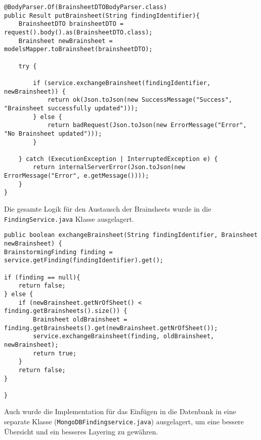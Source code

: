 \begin{lstlisting}[caption={PutBrainsheet nach Refactoring}, label=putBrainsheetNachRef]
@BodyParser.Of(BrainsheetDTOBodyParser.class)
public Result putBrainsheet(String findingIdentifier){
    BrainsheetDTO brainsheetDTO = request().body().as(BrainsheetDTO.class);
    Brainsheet newBrainsheet = modelsMapper.toBrainsheet(brainsheetDTO);

    try {

        if (service.exchangeBrainsheet(findingIdentifier, newBrainsheet)) {
            return ok(Json.toJson(new SuccessMessage("Success", "Brainsheet successfully updated")));
        } else {
            return badRequest(Json.toJson(new ErrorMessage("Error", "No Brainsheet updated")));
        }

    } catch (ExecutionException | InterruptedException e) {
        return internalServerError(Json.toJson(new ErrorMessage("Error", e.getMessage())));
    }
}
\end{lstlisting}

Die gesamte Logik für den Austausch der Brainsheets wurde in die \texttt{FindingService\-.java} Klasse ausgelagert.

\begin{lstlisting}[caption={Exchange Brainsheet im Business Layer}, label=exchangeBrainsheetBusinessLayer]
public boolean exchangeBrainsheet(String findingIdentifier, Brainsheet newBrainsheet) {
BrainstormingFinding finding = service.getFinding(findingIdentifier).get();

if (finding == null){
    return false;
} else {
    if (newBrainsheet.getNrOfSheet() < finding.getBrainsheets().size()) {
        Brainsheet oldBrainsheet = finding.getBrainsheets().get(newBrainsheet.getNrOfSheet());
        service.exchangeBrainsheet(finding, oldBrainsheet, newBrainsheet);
        return true;
    }
    return false;
}

}
\end{lstlisting}

Auch wurde die Implementation für das Einfügen in die Datenbank in eine separate Klasse (\texttt{MongoDBFindingservice.java}) ausgelagert, um eine bessere Übersicht und ein besseres Layering zu gewähren.

